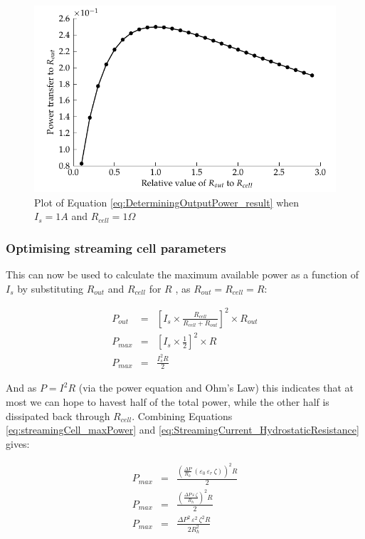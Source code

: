 \begin{figure}
    \centering
        \includegraphics{content/pt1/01-PowerHarvesting/graphics/maximumPowerThereom}
    \caption{\label{fig:Plot-of-PowerTheorem}Plot of Equation \ref{eq:DeterminingOutputPower_result} when $I_{s}=1A$ and $R_{cell}=1\Omega$}
\end{figure}

\subsubsection*{Optimising streaming cell parameters}

This can now be used to calculate the maximum available power as a function of
$I_{s}$ by substituting $R_{out}$ and $R_{cell}$ for $R$ , as
$R_{out}=R_{cell}=R$:

\begin{eqnarray} P_{out} & = &
    \left[I_{s}\times\frac{R_{cell}}{R_{cell}+R_{out}}\right]^{2}\times
    R_{out}\nonumber \\ P_{max} & = &
    \left[I_{s}\times\frac{1}{2}\right]^{2}\times R\nonumber \\ P_{max} & = &
    \frac{I_{s}^{2}R}{2}\label{eq:streamingCell_maxPower} \end{eqnarray}


And as $P=I^{2}R$ (via the power equation and Ohm's Law) this indicates that at
most we can hope to havest half of the total power, while the other half is
dissipated back through $R_{cell}$. Combining Equations
\ref{eq:streamingCell_maxPower} and
\ref{eq:StreamingCurrent_HydrostaticResistance} gives:

\begin{eqnarray*} P_{max} & = & \frac{\left(\frac{\Delta
                P}{R_{h}}\,\left(\varepsilon_{0}\,\varepsilon_{r}\,\zeta\right)\right)^{2}R}{2}\\
    P_{max} & = & \frac{\left(\frac{\Delta
                P\,\varepsilon\,\zeta}{R_{h}}\right)^{2}R}{2}\\ P_{max} & = &
    \frac{\Delta P^{2}\,\varepsilon^{2}\,\zeta^{2}R}{2R_{h}^{2}}
\end{eqnarray*}


